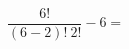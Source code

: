 \documentclass[preview]{standalone}
\begin{document}
\begin{center}
\[ \frac{ \: 6! \: }{(6-2)! \: 2!} - 6 =\]
\end{center}
\end{document}
